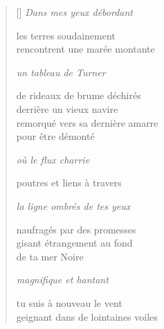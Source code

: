 \documentclass[12pt,a4paper]{article}
\begin{document}
\begin{verse}[\versewidth]
  \emph{Dans mes yeux débordant}

  les terres soudainement \\
  rencontrent une marée montante

  \emph{un tableau de Turner}

  de rideaux de brume déchirés \\
  derrière un vieux navire \\
  remorqué vers sa dernière amarre \\
  pour être démonté

  \emph{où le flux charrie}

  poutres et liens à travers

  \emph{la ligne ombrés de tes yeux}

  naufragés par des promesses \\
  gisant étrangement au fond \\
  de ta mer Noire

  \emph{magnifique et hantant}

  tu suis à nouveau le vent \\
  geignant dans de lointaines voiles
\end{verse}


\newpage

\poemtitle{}

\settowidth{\versewidth}{Vous ne pouvez que ressentir et je vois}

\bigskip
\end{document}
